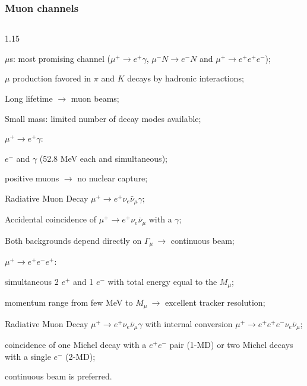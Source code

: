 \documentclass{beamer}
\begin{document}
\begin{frame}
    \frametitle{Muon channels}
    \vspace{-3mm}
    \begin{columns}
     \begin{column}{1.15\framewidth}
     \setlength{\leftmargini}{1.1em}
    
        \begin{itemize}
       {\small     \item $\mu$s: most promising channel ($\mu^+ \rightarrow e^+ \gamma$, $\mu^- N \rightarrow e^- N$ and $\mu^+ \rightarrow e^+ e^+ e^-$);
       \item $\mu$ production favored in $\pi$ and $K$ decays by hadronic interactions;
       \item Long lifetime $\rightarrow$ muon beams;
       \item Small mass: limited number of decay modes available;
       \item $\mu^+ \rightarrow e^+ \gamma$:
       }
       \begin{itemize}
        {\small \item $e^-$ and $\gamma$ (52.8 MeV each and simultaneous);
        \item positive muons $\rightarrow$ no nuclear capture;
        \item Radiative Muon Decay $\mu^+ \rightarrow e^+ \nu_e \bar{\nu}_\mu \gamma$;
        \item Accidental coincidence of $\mu^+ \rightarrow e^+ \nu_e \bar{\nu}_\mu$ with a $\gamma$; 
        \item Both backgrounds depend directly on $\Gamma_\mu \ \rightarrow$ continuous beam;
        }
       \end{itemize}
       \item $\mu^+ \rightarrow e^+ e^- e^+$:
       \begin{itemize}
        {\small \item simultaneous 2 $e^+$ and 1 $e^-$ with total energy equal to the $M_\mu$;
        \item momentum range from few MeV to $M_\mu \ \rightarrow$ excellent tracker resolution;
        \item Radiative Muon Decay $\mu^+ \rightarrow e^+ \nu_e \bar{\nu}_\mu \gamma$ with internal conversion $\mu^+ \rightarrow e^+ e^+ e^- \nu_e \bar{\nu}_\mu$;
        \item coincidence of one Michel decay with a $e^+e^-$ pair (1-MD) or 
        two Michel decays with a single $e^-$ (2-MD);
        \item continuous beam is preferred.

        }
       \end{itemize}
        \end{itemize}
    \end{column}
\end{columns}
\end{frame}
\end{document}
